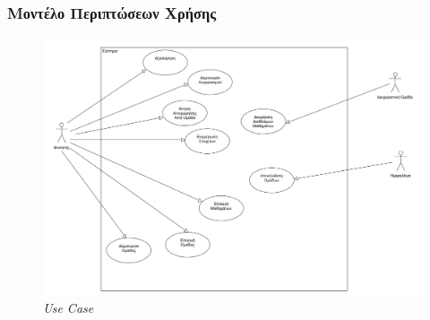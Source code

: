 \documentclass[
]{article}
\begin{document}
\hypertarget{ux3bcux3bfux3bdux3c4ux3adux3bbux3bf-ux3c0ux3b5ux3c1ux3b9ux3c0ux3c4ux3ceux3c3ux3b5ux3c9ux3bd-ux3c7ux3c1ux3aeux3c3ux3b7ux3c2}{%
\subsubsection{Μοντέλο Περιπτώσεων
Χρήσης}\label{ux3bcux3bfux3bdux3c4ux3adux3bbux3bf-ux3c0ux3b5ux3c1ux3b9ux3c0ux3c4ux3ceux3c3ux3b5ux3c9ux3bd-ux3c7ux3c1ux3aeux3c3ux3b7ux3c2}}

\begin{figure}
\centering
\includegraphics{2.png}
\caption{\emph{Use Case}}
\end{figure}
\end{document}
